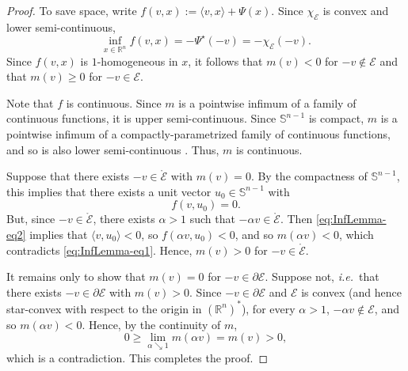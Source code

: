 \documentclass[reqno]{amsart}
\theoremstyle{definition}
\begin{document}
\begin{proof}
	To save space, write $f(v, x) := \langle v, x \rangle + \Psi(x)$.  Since $\chi_{\mathcal{E}}$ is convex and lower semi-continuous,
	\begin{equation}
		\label{eq:InfLemma-eq1}
		\inf_{x \in {\mathbb{R}}^{n}} f(v, x) = - \Psi^{\star} (- v) = - \chi_{\mathcal{E}} (- v).
	\end{equation}
	Since $f(v, x)$ is $1$-homogeneous in $x$, it follows that $m(v) < 0$ for $- v \not\in {\mathcal{E}}$ and that $m(v) \geq 0$ for $- v \in {\mathcal{E}}$.  

	Note that $f$ is continuous.  Since $m$ is a pointwise infimum of a family of continuous functions, it is upper semi-continuous.  Since $\mathbb{S}^{n - 1}$ is compact, $m$ is a pointwise infimum of a compactly-parametrized family of continuous functions, and so is also lower semi-continuous \cite{PenotThera:1982}.  Thus, $m$ is continuous.

	Suppose that there exists $- v \in \mathring{\mathcal{E}}$ with $m(v) = 0$.  By the compactness of $\mathbb{S}^{n - 1}$, this implies that there exists a unit vector $u_{0} \in \mathbb{S}^{n - 1}$ with
	\begin{equation}
		\label{eq:InfLemma-eq2}
		f(v, u_{0}) = 0.
	\end{equation}
	But, since $- v \in \mathring{\mathcal{E}}$, there exists $\alpha > 1$ such that $- \alpha v \in \mathring{\mathcal{E}}$.  Then \eqref{eq:InfLemma-eq2} implies that $\langle v, u_{0} \rangle < 0$, so $f(\alpha v, u_{0}) < 0$, and so $m(\alpha v) < 0$, which contradicts \eqref{eq:InfLemma-eq1}.  Hence, $m(v) > 0$ for $- v \in \mathring{\mathcal{E}}$.

	It remains only to show that $m(v) = 0$ for $- v \in \partial {\mathcal{E}}$.  Suppose not, \emph{i.e.}\ that there exists $- v \in \partial {\mathcal{E}}$ with $m(v) > 0$.  Since $- v \in \partial {\mathcal{E}}$ and ${\mathcal{E}}$ is convex (and hence star-convex with respect to the origin in $({\mathbb{R}}^{n})^{\ast}$), for every $\alpha > 1$, $- \alpha v \not \in {\mathcal{E}}$, and so $m(\alpha v) < 0$.  Hence, by the continuity of $m$,
	\[
		0 \geq \lim_{\alpha \searrow 1} m(\alpha v) = m(v) > 0,
	\]
	which is a contradiction.  This completes the proof.
\end{proof}
\end{document}
